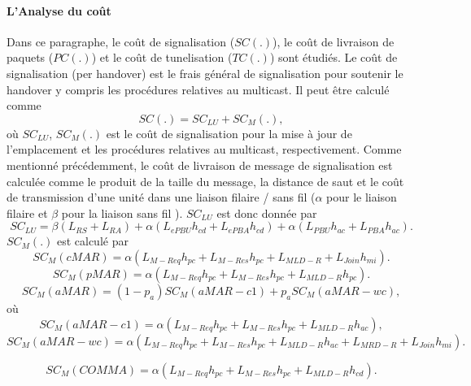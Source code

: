 \paragraph{L'Analyse du coût}
Dans ce paragraphe, le coût de signalisation ($ SC (.) $), le coût de livraison de paquets ($ PC (.) $) et le coût de tunelisation ($ TC (.) $) sont étudiés. Le coût de signalisation (per handover) est le frais général de signalisation pour soutenir le handover y compris les procédures relatives au multicast. Il peut être calculé comme \\
\begin{equation}
SC(.) =SC_{LU} + SC_{M}(.),
\end{equation}
où $ SC_{LU}$, $ SC_{M} (.) $ est le coût de signalisation pour la mise à jour de l'emplacement et les procédures relatives au multicast, respectivement. Comme mentionné précédemment, le coût de livraison de message de signalisation est calculée comme le produit de la taille du message, la distance de saut et le coût de transmission d'une unité dans une liaison filaire / sans fil ($ \alpha $ pour le liaison filaire et $\beta $ pour la liaison sans fil ). $ SC_{LU} $ est donc donnée par \ \
\begin{equation}
SC_{LU} = \beta (L_{RS} + L_{RA}) + \alpha (L_{ePBU}  h_{cd} + L_{ePBA} h_{cd})  + \alpha (L_{PBU}  h_{ac} + L_{PBA} h_{ac}).
\end{equation}
$SC_{M}(.)$ est calculé par\\
\begin{equation}
SC_{M}(cMAR) = \alpha  (L_{M-Req}  h_{pc} + L_{M-Res} h_{pc} + L_{MLD-R} + L_{Join} h_{mi}).
\end{equation}
\begin{equation}
SC_{M}(pMAR) = \alpha (L_{M-Req}  h_{pc} + L_{M-Res} h_{pc} + L_{MLD-R} h_{pc}).
\end{equation}
\begin{equation}
SC_{M}(aMAR) =(1-p_{a}) SC_{M}(aMAR-c1)  + p_{a} SC_{M}(aMAR-wc),
\end{equation}
où 
\begin{equation}
SC_{M}(aMAR-c1) = \alpha (L_{M-Req}  h_{pc} + L_{M-Res} h_{pc} +L_{MLD-R} h_{ac}),
\end{equation}
\begin{equation}
SC_{M}(aMAR-wc) = \alpha (L_{M-Req}  h_{pc} + L_{M-Res} h_{pc}  + L_{MLD-R} h_{ac}+L_{MRD-R} +L_{Join} h_{mi}).
\end{equation}

\begin{equation}
SC_{M}(COMMA) = \alpha (L_{M-Req}  h_{pc} + L_{M-Res} h_{pc}  + L_{MLD-R} h_{cd}).
\end{equation}

